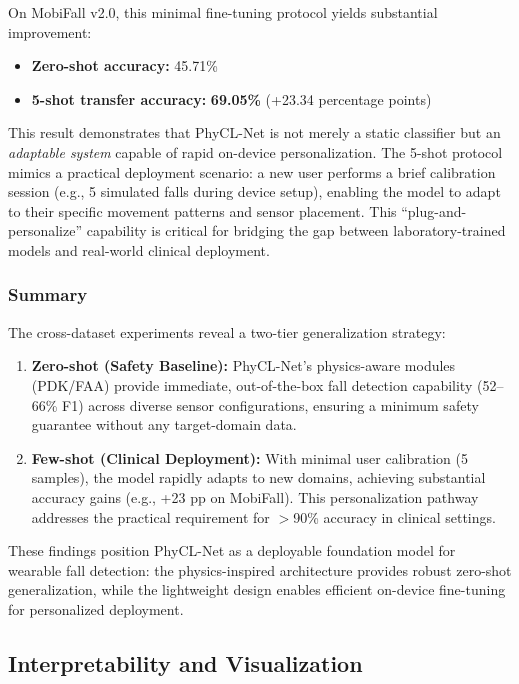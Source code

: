 \documentclass{article}
\begin{document}
On MobiFall v2.0, this minimal fine-tuning protocol yields substantial improvement:
\begin{itemize}
    \item \textbf{Zero-shot accuracy:} 45.71\%
    \item \textbf{5-shot transfer accuracy:} \textbf{69.05\%} (+23.34 percentage points)
\end{itemize}

This result demonstrates that PhyCL-Net is not merely a static classifier but an \textit{adaptable system} capable of rapid on-device personalization. The 5-shot protocol mimics a practical deployment scenario: a new user performs a brief calibration session (e.g., 5 simulated falls during device setup), enabling the model to adapt to their specific movement patterns and sensor placement. This ``plug-and-personalize'' capability is critical for bridging the gap between laboratory-trained models and real-world clinical deployment.

\subsubsection{Summary}

The cross-dataset experiments reveal a two-tier generalization strategy:
\begin{enumerate}
    \item \textbf{Zero-shot (Safety Baseline):} PhyCL-Net's physics-aware modules (PDK/FAA) provide immediate, out-of-the-box fall detection capability (52--66\% F1) across diverse sensor configurations, ensuring a minimum safety guarantee without any target-domain data.
    \item \textbf{Few-shot (Clinical Deployment):} With minimal user calibration (5 samples), the model rapidly adapts to new domains, achieving substantial accuracy gains (e.g., +23 pp on MobiFall). This personalization pathway addresses the practical requirement for $>$90\% accuracy in clinical settings.
\end{enumerate}

These findings position PhyCL-Net as a deployable foundation model for wearable fall detection: the physics-inspired architecture provides robust zero-shot generalization, while the lightweight design enables efficient on-device fine-tuning for personalized deployment.

\subsection{Interpretability and Visualization}
\end{document}
